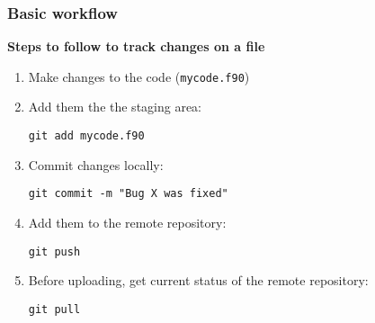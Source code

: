 \documentclass[xcolor=dvipsnames,10pt]{beamer}
\begin{document}
\begin{frame}
 \frametitle{Basic workflow}
 
 \textbf{Steps to follow to track changes on a file} 
 \vspace*{0.5cm}
 
 \begin{enumerate}
  \item Make changes to the code  (\texttt{mycode.f90})
  \vspace*{0.2cm}
  
  \item Add them the the staging area: 
  
  \texttt{git add mycode.f90}
  \vspace*{0.2cm}
  
  \item Commit changes locally:
  
  \texttt{git commit -m "Bug X was fixed"}
  \vspace*{0.2cm}
  
  \pause
  
  \item Add them to the remote repository:
  
  \texttt{git push}
     \vspace*{0.2cm}
  
  \color{white}
  \item[] Before uploading, get current status of the remote repository:
  
  \texttt{git pull}
 \end{enumerate}

\end{frame}
\addtocounter{framenumber}{-1}
\end{document}
